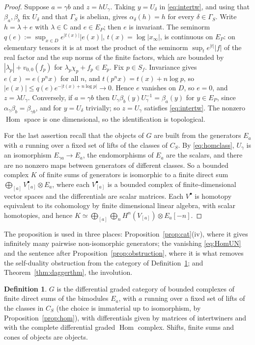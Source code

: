 \documentclass[11pt]{amsart}
\theoremstyle{definition}
\newtheorem{definition}[theorem]{Definition}
\theoremstyle{remark}
\newcommand{\C}{\mathbb C}
\newcommand{\Hom}{\operatorname{Hom}}
\begin{document}
\begin{proof}
Suppose $a=\gamma b$ and $z=hU_{\gamma}$.  Taking $y=U_{\delta}$ in
\eqref{eq:intertw}, and using that $\beta_a,\beta_b$ fix $U_{\delta}$ and that
$\Gamma_S$ is abelian, gives $\alpha_{\delta}(h)=h$ for every
$\delta\in\Gamma_S$.  Write $h=\lambda+e$ with $\lambda\in\C$ and $e\in E_P$;
then $e$ is invariant.  The seminorm $q(e):=\sup_{x\in D}e^{|t(x)|}|e(x)|$,
$t(x)=\log|x_{\infty}|$, is continuous on $E_P$: on elementary tensors it is at
most the product of the seminorm $\sup_te^{|t|}|f|$ of the real factor and
the sup norms of the finite factors, which are bounded by $|\lambda_p|+
v_{0,0}(f_p)$ for $\lambda_p\chi_p+f_p\in E_p$.  Fix $p\in S_f$.  Invariance
gives $e(x)=e(p^{n}x)$ for all $n$, and $t(p^{n}x)=t(x)+n\log p$, so
$|e(x)|\le q(e)e^{-|t(x)+n\log p|}\to0$.  Hence $e$ vanishes on $D$, so $e=0$, and $z=\lambda
U_{\gamma}$.  Conversely, if $a=\gamma b$ then
$U_{\gamma}\beta_b(y)U_{\gamma}^{-1}=\beta_a(y)$ for $y\in E_P$, since
$\alpha_{\gamma}\beta_b=\beta_{\gamma b}$, and for $y=U_{\delta}$ trivially; so
$z=U_{\gamma}$ satisfies \eqref{eq:intertw}.  The nonzero $\Hom$ space is one
dimensional, so the identification is topological.

For the last assertion recall that the objects of $G$ are built from the
generators $E_a$ with $a$ running over a fixed set of lifts of the classes of
$C_S$.  By
\eqref{eq:homclass}, $U_{\gamma}$ is an isomorphism $E_{\gamma a}\to E_a$, the
endomorphisms of $E_a$ are the scalars, and there are no nonzero maps between
generators of different classes.  So a bounded complex $K$ of finite sums of
generators is isomorphic to a finite direct sum $\bigoplus_{[a]}V_{[a]}^{\bullet}
\otimes E_a$, where each $V_{[a]}^{\bullet}$ is a bounded complex of
finite-dimensional vector spaces and the differentials are scalar matrices.
Each $V^{\bullet}$ is homotopy equivalent to its cohomology by finite
dimensional linear algebra, with scalar homotopies, and hence
$K\simeq\bigoplus_{[a]}\bigoplus_nH^{n}(V_{[a]})\otimes E_a[-n]$.
\end{proof}

The proposition is used in three places: Proposition~\ref{prop:cat}(iv), where it
gives infinitely many pairwise non-isomorphic generators; the vanishing
\eqref{eq:HomUN} and the sentence after Proposition~\ref{prop:obstruction},
where it is what removes the self-duality obstruction from the category of
Definition~\ref{def:G}; and Theorem~\ref{thm:daggerthm}, the involution.

\begin{definition}\label{def:G}
$G$ is the differential graded category of bounded complexes of finite direct
sums of the bimodules $E_a$, with $a$ running over a fixed set of lifts of the
classes in $C_S$ (the choice is immaterial up to isomorphism, by
Proposition~\ref{prop:hom}), with differentials given by matrices
of intertwiners and with the complete differential graded $\Hom$ complex.
Shifts, finite sums and cones of objects are objects.
\end{definition}
\end{document}
